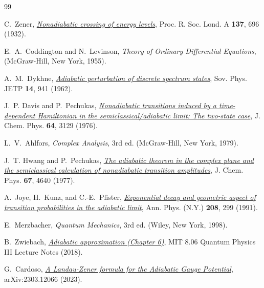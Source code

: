 \documentclass[12pt,a4paper]{article}
\begin{document}
	\newpage
	\label{sec:References}
	\begin{thebibliography}{99}
		
		C.~Zener,
		\href{https://doi.org/10.1098/rspa.1932.0165}{\textit{Nonadiabatic crossing of energy levels}},
		Proc. R. Soc. Lond. A \textbf{137}, 696 (1932).
		
		E.~A.~Coddington and N.~Levinson,
		\textit{Theory of Ordinary Differential Equations},
		(McGraw-Hill, New York, 1955).
		
		A.~M.~Dykhne,
		\href{https://jetp.ras.ru/cgi-bin/dn/e_014_04_0941.pdf}{\textit{Adiabatic perturbation of discrete spectrum states}},
		Sov. Phys. JETP \textbf{14}, 941 (1962).
		
		J.~P. Davis and P.~Pechukas,
		\href{https://doi.org/10.1063/1.432648}{\textit{Nonadiabatic transitions induced by a time-dependent Hamiltonian in the semiclassical/adiabatic limit: The two-state case}},
		J. Chem. Phys. \textbf{64}, 3129 (1976).
		
		L.~V.~Ahlfors,
		\textit{Complex Analysis},
		3rd ed. (McGraw-Hill, New York, 1979).
		
		J.~T. Hwang and P.~Pechukas,
		\href{https://doi.org/10.1063/1.434630}{\textit{The adiabatic theorem in the complex plane and the semiclassical calculation of nonadiabatic transition amplitudes}},
		J. Chem. Phys. \textbf{67}, 4640 (1977).
		
		A.~Joye, H.~Kunz, and C.-E.~Pfister,
		\href{https://doi.org/10.1016/0003-4916(91)90297-L}{\textit{Exponential decay and geometric aspect of transition probabilities in the adiabatic limit}},
		Ann. Phys. (N.Y.) \textbf{208}, 299 (1991).
		
		E.~Merzbacher,
		\textit{Quantum Mechanics},
		3rd ed. (Wiley, New York, 1998).
		
		B.~Zwiebach,
		\href{https://ocw.mit.edu/courses/8-06-quantum-physics-iii-spring-2018/95ffb7405e75bec4f75564318e173ce0_MIT8_06S18ch6.pdf}{\textit{Adiabatic approximation (Chapter 6)}},
		MIT 8.06 Quantum Physics III Lecture Notes (2018).
		
		G.~Cardoso,
		\href{https://arxiv.org/abs/2303.12066}{\textit{A Landau-Zener formula for the Adiabatic Gauge Potential}},
		arXiv:2303.12066 (2023).
		
	\end{thebibliography}
	
\end{document}
